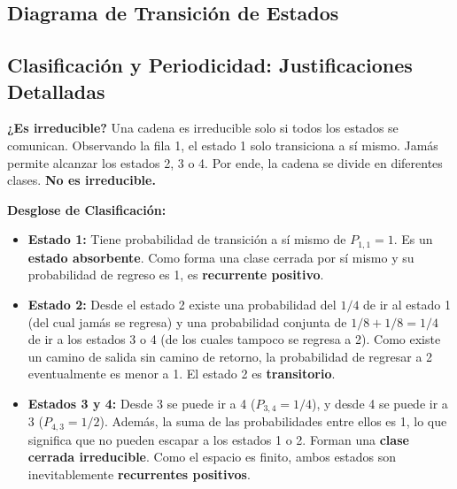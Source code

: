 \documentclass[12pt, a4paper]{article}
\begin{document}
\subsection{Diagrama de Transición de Estados}
\begin{center}
\end{center}

\subsection{Clasificación y Periodicidad: Justificaciones Detalladas}
\textbf{¿Es irreducible?} 
Una cadena es irreducible solo si todos los estados se comunican. Observando la fila 1, el estado 1 solo transiciona a sí mismo. Jamás permite alcanzar los estados 2, 3 o 4. Por ende, la cadena se divide en diferentes clases. \textbf{No es irreducible.}

\textbf{Desglose de Clasificación:}
\begin{itemize}
    \item \textbf{Estado 1:} Tiene probabilidad de transición a sí mismo de $P_{1,1} = 1$. Es un \textbf{estado absorbente}. Como forma una clase cerrada por sí mismo y su probabilidad de regreso es 1, es \textbf{recurrente positivo}.
    \item \textbf{Estado 2:} Desde el estado 2 existe una probabilidad del $1/4$ de ir al estado 1 (del cual jamás se regresa) y una probabilidad conjunta de $1/8 + 1/8 = 1/4$ de ir a los estados 3 o 4 (de los cuales tampoco se regresa a 2). Como existe un camino de salida sin camino de retorno, la probabilidad de regresar a 2 eventualmente es menor a 1. El estado 2 es \textbf{transitorio}.
    \item \textbf{Estados 3 y 4:} Desde 3 se puede ir a 4 ($P_{3,4} = 1/4$), y desde 4 se puede ir a 3 ($P_{4,3} = 1/2$). Además, la suma de las probabilidades entre ellos es 1, lo que significa que no pueden escapar a los estados 1 o 2. Forman una \textbf{clase cerrada irreducible}. Como el espacio es finito, ambos estados son inevitablemente \textbf{recurrentes positivos}.
\end{itemize}
\end{document}
